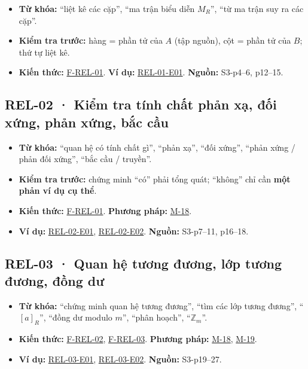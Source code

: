 \documentclass[
  10pt,
  twoside,openany]{book}
\providecommand{\tightlist}{%
  \setlength{\itemsep}{0pt}\setlength{\parskip}{0pt}}
\begin{document}
\begin{itemize}
\tightlist
\item
  \textbf{Từ khóa:} ``liệt kê các cặp'', ``ma trận biểu diễn \(M_R\)'',
  ``từ ma trận suy ra các cặp''.
\item
  \textbf{Kiểm tra trước:} hàng = phần tử của \(A\) (tập nguồn), cột =
  phần tử của \(B\); thứ tự liệt kê.
\item
  \textbf{Kiến thức:} \protect\hyperlink{F-REL-01}{F-REL-01}. \textbf{Ví
  dụ:} \protect\hyperlink{REL-01-E01}{REL-01-E01}. \textbf{Nguồn:}
  S3-p4--6, p12--15.
\end{itemize}

\hypertarget{REL-02}{%
\subsection{REL-02 · Kiểm tra tính chất phản xạ, đối xứng, phản xứng,
bắc cầu}\label{REL-02}}

\begin{itemize}
\tightlist
\item
  \textbf{Từ khóa:} ``quan hệ có tính chất gì'', ``phản xạ'', ``đối
  xứng'', ``phản xứng / phản đối xứng'', ``bắc cầu / truyền''.
\item
  \textbf{Kiểm tra trước:} chứng minh ``có'' phải tổng quát; ``không''
  chỉ cần \textbf{một phản ví dụ cụ thể}.
\item
  \textbf{Kiến thức:} \protect\hyperlink{F-REL-01}{F-REL-01}.
  \textbf{Phương pháp:} \protect\hyperlink{M-18}{M-18}.
\item
  \textbf{Ví dụ:} \protect\hyperlink{REL-02-E01}{REL-02-E01},
  \protect\hyperlink{REL-02-E02}{REL-02-E02}. \textbf{Nguồn:} S3-p7--11,
  p16--18.
\end{itemize}

\hypertarget{REL-03}{%
\subsection{REL-03 · Quan hệ tương đương, lớp tương đương, đồng
dư}\label{REL-03}}

\begin{itemize}
\tightlist
\item
  \textbf{Từ khóa:} ``chứng minh quan hệ tương đương'', ``tìm các lớp
  tương đương'', ``\([a]_R\)'', ``đồng dư modulo \(m\)'', ``phân
  hoạch'', ``\(\mathbb Z_m\)''.
\item
  \textbf{Kiến thức:} \protect\hyperlink{F-REL-02}{F-REL-02},
  \protect\hyperlink{F-REL-03}{F-REL-03}. \textbf{Phương pháp:}
  \protect\hyperlink{M-18}{M-18}, \protect\hyperlink{M-19}{M-19}.
\item
  \textbf{Ví dụ:} \protect\hyperlink{REL-03-E01}{REL-03-E01},
  \protect\hyperlink{REL-03-E02}{REL-03-E02}. \textbf{Nguồn:}
  S3-p19--27.
\end{itemize}
\end{document}
